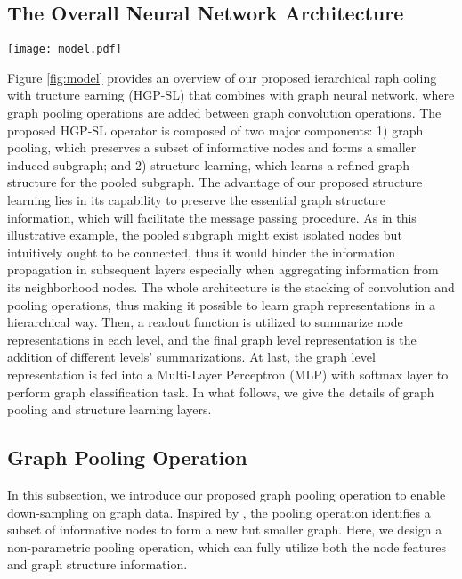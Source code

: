 \documentclass[letterpaper]{article} \usepackage{aaai20}  \usepackage{times}  \usepackage{helvet} \usepackage{courier}  \usepackage[hyphens]{url}  \usepackage{graphicx} \urlstyle{rm} \def\UrlFont{\rm}  \usepackage{graphicx}  \frenchspacing  \setlength{\pdfpagewidth}{8.5in}  \setlength{\pdfpageheight}{11in}
\begin{document}
\subsection{The Overall Neural Network Architecture}
\begin{figure*}
  \centering
  \texttt{[image: model.pdf]}
  \caption{Architecture of proposed HGP-SL operator combined with graph neural network. The dashed box demonstrates the workflow of HGP-SL, which involves graph pooling and structure learning. The learned edges are represented as dashed lines in the graph. This procedure (convolution and pooling operations) is repeated several times. Then, a readout function is applied to aggregate node representations to make a fixed size representation, which goes through MLP layers for graph classification.}
  \label{fig:model}
\end{figure*}
Figure \ref{fig:model} provides an overview of our proposed ierarchical raph ooling with tructure earning (HGP-SL) that combines with graph neural network, where graph pooling operations are added between graph convolution operations. The proposed HGP-SL operator is composed of two major components: 1) graph pooling, which preserves a subset of informative nodes and forms a smaller induced subgraph; and 2) structure learning, which learns a refined graph structure for the pooled subgraph. The advantage of our proposed structure learning lies in its capability to preserve the essential graph structure information, which will facilitate the message passing procedure. As in this illustrative example, the pooled subgraph might exist isolated nodes but intuitively ought to be connected, thus it would hinder the information propagation in subsequent layers especially when aggregating information from its neighborhood nodes. The whole architecture is the stacking of convolution and pooling operations, thus making it possible to learn graph representations in a hierarchical way. Then, a readout function is utilized to summarize node representations in each level, and the final graph level representation is the addition of different levels' summarizations. At last, the graph level representation is fed into a Multi-Layer Perceptron (MLP) with softmax layer to perform graph classification task. In what follows, we give the details of graph pooling and structure learning layers.

\subsection{Graph Pooling Operation}
In this subsection, we introduce our proposed graph pooling operation to enable down-sampling on graph data. Inspired by \cite{gao2019graph,lee2019self,gao2019ipool}, the pooling operation identifies a subset of informative nodes to form a new but smaller graph. Here, we design a non-parametric pooling operation, which can fully utilize both the node features and graph structure information. 
\end{document}

